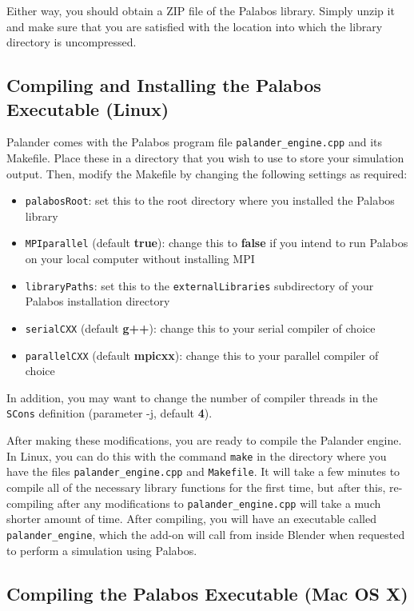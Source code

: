 \documentclass[12pt]{article}
\begin{document}
Either way, you should obtain a ZIP file of the Palabos library. Simply unzip it and make sure that you are 
satisfied with the location into which the library directory is uncompressed.

\subsection{Compiling and Installing the Palabos Executable (Linux)} \label{install_linux}

Palander comes with the Palabos program file \verb|palander_engine.cpp| and its Makefile. Place these in a 
directory that you wish to use to store your simulation output. Then, modify the Makefile by changing the 
following settings as required:
\begin{itemize}
\item \verb|palabosRoot|: set this to the root directory where you installed the Palabos library
\item \verb|MPIparallel| (default {\bf true}): change this to {\bf false} if you intend to run Palabos on 
your local computer without installing MPI
\item \verb|libraryPaths|: set this to the \verb|externalLibraries| subdirectory of your Palabos installation 
directory
\item \verb|serialCXX| (default {\bf g++}): change this to your serial compiler of choice
\item \verb|parallelCXX| (default {\bf mpicxx}): change this to your parallel compiler of choice
\end{itemize}
In addition, you may want to change the number of compiler threads in the \verb|SCons| definition (parameter 
-j, default {\bf 4}).

After making these modifications, you are ready to compile the Palander engine. In Linux, you can do this 
with the command \verb|make| in the directory where you have the files \verb|palander_engine.cpp| and 
\verb|Makefile|. It will take a few minutes to compile all of the necessary library functions for the first 
time, but after this, re-compiling after any modifications to \verb|palander_engine.cpp| will take a much 
shorter amount of time. After compiling, you will have an executable called \verb|palander_engine|, which the 
add-on will call from inside Blender when requested to perform a simulation using Palabos.

\subsection{Compiling the Palabos Executable (Mac OS X)}
\end{document}
